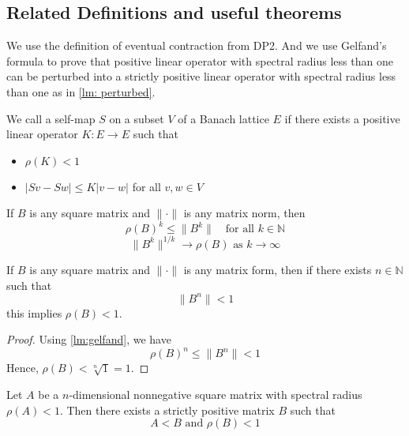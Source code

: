 \subsection{Related Definitions and useful theorems}
We use the definition of eventual contraction from DP2. And we use Gelfand's formula to prove that positive linear operator with spectral radius less than one can be perturbed into a strictly positive linear operator with spectral radius less than one as in \autoref{lm: perturbed}.\\
\begin{definition}
We call a self-map $S$ on a subset $V$ of a Banach lattice $E$ if there exists a positive linear operator $K:E \to E$ such that
\begin{itemize}
    \item $\rho(K)<1$ 
    \item $|Sv-Sw|\le K|v-w|$  for all $v,w\in V$
\end{itemize}

\end{definition}
\begin{lemma}\label{lm:gelfand}
    If $B$ is any square matrix and $\|\cdot\|$ is any matrix norm, then
    $$
    \rho(B)^k\le \|B^k\|\quad \text{for all $k\in\mathbb{N}$}
    $$
    $$
    \|B^k\|^{1/k}\to \rho(B)\text{ as $k\to\infty$}
    $$
\end{lemma}
\begin{corollary}\label{col:gelfand col}
    If $B$ is any square matrix and $\|\cdot\|$ is any matrix form, then if there exists $n\in\mathbb{N}$ such that 
    $$
    \|B^n\|<1
    $$
    this implies $\rho(B)<1$.
\end{corollary}
\begin{proof}
    Using \autoref{lm:gelfand}, we have
    $$
    \rho(B)^n \le \|B^n\|<1
    $$
    Hence, $\rho(B)< \sqrt[n]{1}=1$.
\end{proof}
\begin{lemma}\label{lm: perturbed}
Let $A$ be a $n$-dimensional nonnegative square matrix with spectral radius $\rho(A)<1$. Then there exists a strictly positive matrix $B$ such that 
$$
A< B\text{ and $\rho(B)<1$}
$$
\end{lemma}
